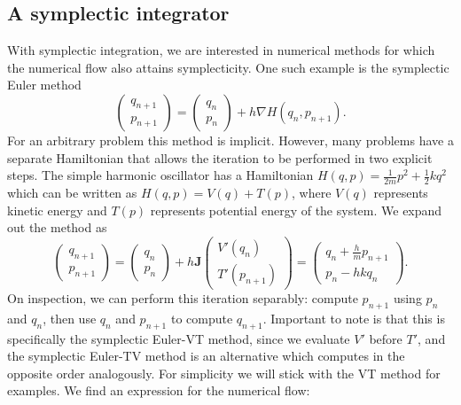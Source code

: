 \documentclass{report}
\begin{document}
\subsection{A symplectic integrator}
With symplectic integration, we are interested in numerical methods for which the numerical flow also attains symplecticity.
One such example is the symplectic Euler method
\begin{equation*}
	\begin{pmatrix}
		q_{n+1} \\
		p_{n+1} 
	\end{pmatrix} = \begin{pmatrix}
		q_{n} \\
		p_{n}
	\end{pmatrix} + h \nabla H(q_{n}, p_{n+1}).
\end{equation*}
For an arbitrary problem this method is implicit. However, many problems have a separate Hamiltonian that allows the iteration to be performed in two explicit steps. 
The simple harmonic oscillator has a Hamiltonian $H(q, p) = \frac{1}{2m}p^2 + \frac{1}{2}kq^2$ which can be written as $H(q, p) = V(q) + T(p)$, where $V(q)$ represents kinetic energy and $T(p)$ represents potential energy of the system.
We expand out the method as
\begin{equation*}
	\begin{pmatrix}
		q_{n+1} \\
		p_{n+1} 
	\end{pmatrix} = \begin{pmatrix}
		q_{n} \\
		p_{n}
	\end{pmatrix} + h \mathbf{J} \begin{pmatrix}
		V'(q_n) \\
		T'(p_{n+1})
	\end{pmatrix} = \begin{pmatrix}
		q_{n} + \frac{h}{m}p_{n+1} \\
		p_{n} - hk q_n
	\end{pmatrix}.
\end{equation*}
On inspection, we can perform this iteration separably: compute $p_{n+1}$ using $p_n$ and $q_n$,
then use $q_n$ and $p_{n+1}$ to compute $q_{n+1}$.
Important to note is that this is specifically the symplectic Euler-VT method, since we evaluate $V'$ before $T'$,
and the symplectic Euler-TV method is an alternative which computes in the opposite order analogously.
For simplicity we will stick with the VT method for examples.
We find an expression for the numerical flow:
\end{document}
